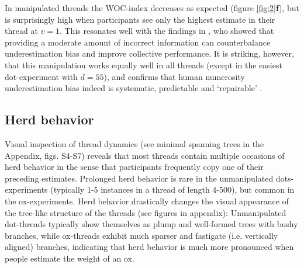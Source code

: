 \documentclass[10pt,a4paper,twocolumn,lineno]{article}
\begin{document}
In manipulated threads the WOC-index decreases as expected (figure \ref{fig:2}\textbf{f}), but is surprisingly high when participants see only the highest estimate in their thread at $v=1$. This resonates well with the findings in \cite{jayles2017social}, who showed that providing a moderate amount of incorrect information can counterbalance underestimation bias and improve collective performance. It is striking, however, that this manipulation works equally well in all threads (except in the easiest dot-experiment with $d=55$), and confirms that human numerosity underestimation bias indeed is systematic, predictable and `repairable' \cite{jayles2017social, kao2018counteracting, indow1977scaling, nash2017sequential}.
 
\subsection{Herd behavior}
\noindent
Visual inspection of thread dynamics (see minimal spanning trees in the Appendix, figs. S4-S7) reveals that most threads contain multiple occasions of herd behavior in the sense that participants frequently copy one of their preceding estimates. Prolonged herd behavior is rare in the unmanipulated dots-experiments (typically 1-5 instances in a thread of length 4-500), but common in the ox-experiments. Herd behavior drastically changes the visual appearance of the tree-like structure of the threads (see figures in appendix): Unmanipulated dot-threads typically show themselves as plump and well-formed trees with bushy branches, while ox-threads exhibit much sparser and fastigate (i.e. vertically aligned) branches, indicating that herd behavior is much more pronounced when people estimate the weight of an ox.
\end{document}
